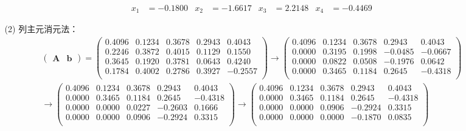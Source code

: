 \documentclass{sjtuarticle}
\begin{document}
\begin{itemize}
\begin{solution}
\begin{itemize}
        \begin{align*}
            x_1&=     -0.1800 & x_2&=     -1.6617 & x_3&=      2.2148 & x_4&=     -0.4469
        \end{align*}
        \item[(2)] 列主元消元法：
        \begin{align*}
            \begin{pmatrix}
                \bm{A} & \bm{b}
            \end{pmatrix}=
            \begin{pmatrix}
                0.4096 &       0.1234 &       0.3678 &       0.2943 &        0.4043\\
                0.2246 &       0.3872 &       0.4015 &       0.1129 &        0.1550\\
                0.3645 &       0.1920 &       0.3781 &       0.0643 &        0.4240\\
                0.1784 &       0.4002 &       0.2786 &       0.3927 &       -0.2557\\
          \end{pmatrix}\rightarrow
          \begin{pmatrix}
                0.4096 &       0.1234 &       0.3678 &       0.2943 &        0.4043\\
                0.0000 &       0.3195 &       0.1998 &      -0.0485 &       -0.0667\\
                0.0000 &       0.0822 &       0.0508 &      -0.1976 &        0.0642\\
                0.0000 &       0.3465 &       0.1184 &       0.2645 &       -0.4318\\
          \end{pmatrix}\\
          \rightarrow\begin{pmatrix}
                0.4096 &       0.1234 &       0.3678 &       0.2943 &        0.4043\\
                0.0000 &       0.3465 &       0.1184 &       0.2645 &       -0.4318\\
                0.0000 &       0.0000 &       0.0227 &      -0.2603 &        0.1666\\
                0.0000 &       0.0000 &       0.0906 &      -0.2924 &        0.3315\\
          \end{pmatrix}\rightarrow
          \begin{pmatrix}
                0.4096 &       0.1234 &       0.3678 &       0.2943 &        0.4043\\
                0.0000 &       0.3465 &       0.1184 &       0.2645 &       -0.4318\\
                0.0000 &       0.0000 &       0.0906 &      -0.2924 &        0.3315\\
                0.0000 &       0.0000 &       0.0000 &      -0.1870 &        0.0835\\
          \end{pmatrix}
        \end{align*}


\end{itemize}
\end{solution}
\end{itemize}
\end{document}
